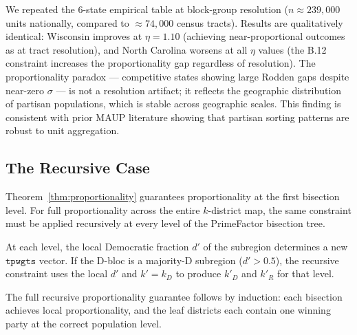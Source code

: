 We repeated the 6-state empirical table at block-group resolution
($n \approx 239{,}000$ units nationally, compared to $\approx 74{,}000$ census
tracts).
Results are qualitatively identical: Wisconsin improves at $\eta = 1.10$
(achieving near-proportional outcomes as at tract resolution), and North Carolina
worsens at all $\eta$ values (the B.12 constraint increases the proportionality
gap regardless of resolution).
The proportionality paradox --- competitive states showing large Rodden gaps
despite near-zero $\sigma$ --- is not a resolution artifact; it reflects the
geographic distribution of partisan populations, which is stable across
geographic scales.
This finding is consistent with prior MAUP literature
\citep{chen2013} showing that partisan sorting patterns are robust to
unit aggregation.

\subsection{The Recursive Case}

Theorem~\ref{thm:proportionality} guarantees proportionality at the first
bisection level.
For full proportionality across the entire $k$-district map, the same
constraint must be applied recursively at every level of the PrimeFactor
bisection tree.

At each level, the local Democratic fraction $d'$ of the subregion determines
a new $\mathtt{tpwgts}$ vector.
If the D-bloc is a majority-D subregion ($d' > 0.5$), the recursive constraint
uses the local $d'$ and $k' = k_D$ to produce $k'_D$ and $k'_R$ for that level.

The full recursive proportionality guarantee follows by induction:
each bisection achieves local proportionality, and the leaf districts
each contain one winning party at the correct population level.
